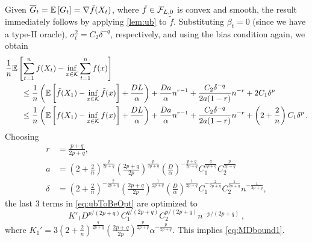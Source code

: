 Given $\overline{G}_t=\mathbb{E}\left[G_t\right] = \nabla \tilde{f}(X_t)$, where $\tilde{f}\in \mathcal{F}_{L,0}$ is convex and smooth,
the result immediately follows by applying \cref{lem:ub} to $\tilde{f}$.
Substituting
 $\beta_t = 0$ (since we have a type-II oracle), $\sigma^2_t = C_2 \delta^{-q}$, respectively, and using the bias condition again, we obtain
 \begin{align}
\MoveEqLeft
\frac{1}{n} \EE{ \sum_{t=1}^n f( X_t) - \inf_{x \in \cK} \sum_{t=1}^n f(x)} \nonumber \\
&\le \frac{1}{n}\left(\EE{\tilde{f}(X_1)-\inf_{x \in \cK}\tilde{f}(x)}+\frac{DL}{\alpha}  \right) %
+\frac{Da}{\alpha} n^{r-1}+\dfrac{C_2 \delta^{-q}}{2a(1-r)}n^{-r}+ 2 C_1\delta^p \\
&\le \frac{1}{n}\left(\EE{f(X_1)-\inf_{x \in \cK}f(x)}+\frac{DL}{\alpha}  \right) %
+\frac{Da}{\alpha} n^{r-1}+\dfrac{C_2 \delta^{-q}}{2a(1-r)}n^{-r}+ \left(2+\dfrac{2}{n}\right)C_1\delta^p \,.
\label{eq:ubToBeOpt}
 \end{align}
 Choosing 
 \begin{align*} 
 r &= \tfrac{p+q}{2p+q}, \\  
a&= \left(2+\tfrac{2}{n}\right)^{\frac{q}{2p+q}}\left(\tfrac{2p+q}{2p}\right)^{\frac{p}{2p+q}} \left(\tfrac{D}{\alpha}\right)^{-\frac{p+q}{2p+q}}  C_1^{\frac{q}{2p+q}} C_2^{\frac{p}{2p+q}} \\
 \delta &=  \left(2+\tfrac{2}{n}\right)^{-\frac{2}{2p+q}}\left(\tfrac{2p+q}{2p}\right)^{\frac{1}{2p+q}} \left(\tfrac{D}{\alpha}\right)^{\frac{1}{2p+q}}  C_1^{-\frac{2}{2p+q}} C_2^{\frac{1}{2p+q}} n^{-\frac{1}{2p+q}}, 
 \end{align*}
the last $3$ terms in \eqref{eq:ubToBeOpt} are optimized to
 \[
 K'_1 D^{p/(2p+q)} C_1^{q/(2p+q)} C_2^{p/(2p+q)} n ^{-p/(2p+q)} \,,
 \]
where $K_1'= 3\left(2+\frac{2}{n}\right)^{\frac{q}{2p+q}}\left(\frac{2p+q}{2p}\right)^{\frac{p}{2p+q}}  \alpha^{-\frac{p}{2p+q}}$.
 This implies \eqref{eq:MDbound1}.
 
